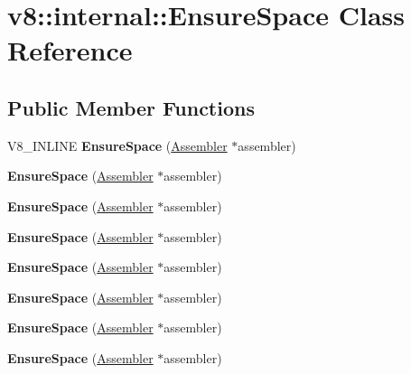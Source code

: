 \hypertarget{classv8_1_1internal_1_1EnsureSpace}{}\section{v8\+:\+:internal\+:\+:Ensure\+Space Class Reference}
\label{classv8_1_1internal_1_1EnsureSpace}
\subsection*{Public Member Functions}
\begin{DoxyCompactItemize}
\item 
\mbox{\label{classv8_1_1internal_1_1EnsureSpace_aa9bad60940e8fda51cd78378bd009ab6}} 
V8\+\_\+\+I\+N\+L\+I\+NE {\bfseries Ensure\+Space} (\mbox{\hyperlink{classv8_1_1internal_1_1Assembler}{Assembler}} $\ast$assembler)
\item 
\mbox{\label{classv8_1_1internal_1_1EnsureSpace_aa9bad60940e8fda51cd78378bd009ab6}} 
{\bfseries Ensure\+Space} (\mbox{\hyperlink{classv8_1_1internal_1_1Assembler}{Assembler}} $\ast$assembler)
\item 
\mbox{\label{classv8_1_1internal_1_1EnsureSpace_aa9bad60940e8fda51cd78378bd009ab6}} 
{\bfseries Ensure\+Space} (\mbox{\hyperlink{classv8_1_1internal_1_1Assembler}{Assembler}} $\ast$assembler)
\item 
\mbox{\label{classv8_1_1internal_1_1EnsureSpace_aa9bad60940e8fda51cd78378bd009ab6}} 
{\bfseries Ensure\+Space} (\mbox{\hyperlink{classv8_1_1internal_1_1Assembler}{Assembler}} $\ast$assembler)
\item 
\mbox{\label{classv8_1_1internal_1_1EnsureSpace_aa9bad60940e8fda51cd78378bd009ab6}} 
{\bfseries Ensure\+Space} (\mbox{\hyperlink{classv8_1_1internal_1_1Assembler}{Assembler}} $\ast$assembler)
\item 
\mbox{\label{classv8_1_1internal_1_1EnsureSpace_aa9bad60940e8fda51cd78378bd009ab6}} 
{\bfseries Ensure\+Space} (\mbox{\hyperlink{classv8_1_1internal_1_1Assembler}{Assembler}} $\ast$assembler)
\item 
\mbox{\label{classv8_1_1internal_1_1EnsureSpace_aa9bad60940e8fda51cd78378bd009ab6}} 
{\bfseries Ensure\+Space} (\mbox{\hyperlink{classv8_1_1internal_1_1Assembler}{Assembler}} $\ast$assembler)
\item 
\mbox{\label{classv8_1_1internal_1_1EnsureSpace_aa9bad60940e8fda51cd78378bd009ab6}} 
{\bfseries Ensure\+Space} (\mbox{\hyperlink{classv8_1_1internal_1_1Assembler}{Assembler}} $\ast$assembler)
\end{DoxyCompactItemize}


